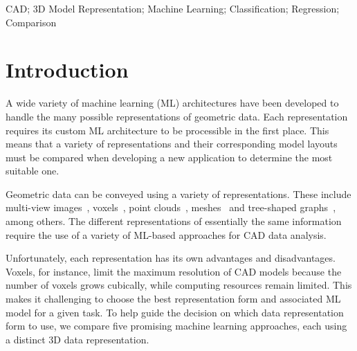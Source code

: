 \documentclass[5p,times,procedia]{elsarticle}
\begin{document}
\begin{frontmatter}
\begin{keyword}
CAD; 3D Model Representation; Machine Learning; Classification; Regression; Comparison 




\end{keyword}

\end{frontmatter}



\section{Introduction}\label{sec:Introduction}
A wide variety of machine learning (ML) architectures have been developed to handle the many possible representations of geometric data.
Each representation requires its custom ML architecture to be processible in the first place.
This means that a variety of representations and their corresponding model layouts must be compared when developing a new application to determine the most suitable one. 

Geometric data can be conveyed using a variety of representations.
These include multi-view images~\cite{kanezaki2018rotationnet}, voxels~\cite{liu2019point-voxel,wang2019normalnet}, point clouds~\cite{qi2016pointnet}, meshes~\cite{pernot2015thin} and tree-shaped graphs~\cite{miles2023recursive}, among others.
The different representations of essentially the same information require the use of a variety of ML-based approaches for CAD data analysis. 

Unfortunately, each representation has its own advantages and disadvantages.
Voxels, for instance, limit the maximum resolution of CAD models because the number of voxels grows cubically, while computing resources remain limited.
This makes it challenging to choose the best representation form and associated ML model for a given task.
To help guide the decision on which data representation form to use, we compare five promising machine learning approaches, each using a distinct 3D data representation.
\end{document}
